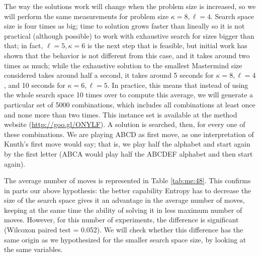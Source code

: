 \documentclass[preprint,12pt]{elsarticle}
\begin{document}
The way the solutions work will change when the problem size is increased, so we
will perform the same measurements for problem size $\kappa=8, \ell=4$. Search space size is four times as big; time to solution grows faster
than lineally so it is not practical (although possible) to work with
exhaustive search for sizes bigger than that; in fact,
$\ell=5,\kappa=6$ is the next step that is feasible, but initial work
has shown that the behavior is not different from this case, and it
takes around two times as much; while the exhaustive
solution to the smallest Mastermind size considered takes around half
a second, it takes around 5 seconds for $\kappa=8, \ell=4$, and 10
seconds for $\kappa=6,\ell=5$. In practice, this means that instead of
using the whole search space 10 times over to compute this average, we will generate a
particular set of 5000 combinations, which includes all combinations
at least once and none more than two times. This instance set is available at
the method website (\url{http://goo.gl/ONYLF}).
A solution is searched, then, for every one of
these combinations. We are playing ABCD as first move, as one
interpretation of Knuth's \cite{Knuth} first move would say; that is,
we play half the alphabet and start again by the first letter (ABCA
would play half the ABCDEF alphabet and then start again). 

The average number of moves is represented in
Table \ref{tab:me:48}. This confirms in parts our above hypothesis:
the better capability Entropy has to decrease the size of the search
space gives it an advantage in the average number of moves, keeping at the
same time the ability of solving it in less maximum number of
moves. However, for this number of experiments, the difference is 
significant  (Wilcoxon paired test = 0.052). We will check
whether this difference has the same origin as we hypothesized
for the smaller search space size, by looking at the same variables. 
\end{document}
